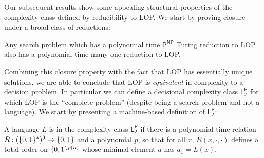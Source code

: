 Our subsequent results show some appealing structural properties of the complexity class defined by reducibility to LOP. We start by proving closure under a broad class of reductions:
\begin{theorem}
Any search problem which has a polynomial time $\mathsf{P^{NP}}$ Turing reduction to LOP also has a polynomial time many-one reduction to LOP.
\end{theorem}
Combining this closure property with the fact that LOP has essentially unique solutions, we are able to conclude that LOP is \emph{equivalent} in complexity to a decision problem. In particular we can define a decisional complexity class $\mathsf{L_2^P}$ for which LOP is the ``complete problem'' (despite being a search problem and not a language). We start by presenting a machine-based definition of $\mathsf{L_2^P}$:
\begin{definition}
A language $L$ is in the complexity class $\mathsf{L_2^P}$ if there is a polynomial time relation $R: (\{0,1\}^*)^3 \to \{0,1\}$ and a polynomial $p$, so that for all $x$, $R(x, \cdot, \cdot)$ defines a total order on $\{0,1\}^{p(n)}$ whose minimal element $a$ has $a_1 = L(x)$. 
\end{definition}


